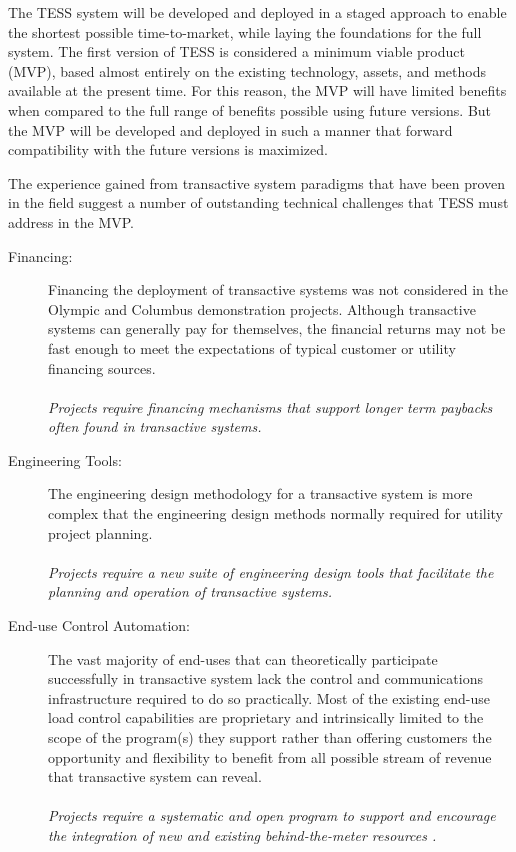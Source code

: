 The TESS system will be developed and deployed in a staged approach to enable the shortest possible time-to-market, while laying the foundations for the full system.  The first version of TESS is considered a minimum viable product (MVP), based almost entirely on the existing technology, assets, and methods available at the present time. For this reason, the MVP will have limited benefits when compared to the full range of benefits possible using future versions.  But the MVP will be developed and deployed in such a manner that forward compatibility with the future versions is maximized.

The experience gained from transactive system paradigms that have been proven in the field suggest a number of outstanding technical challenges that TESS must address in the MVP.  

\begin{description}

    \item[Financing:] Financing the deployment of transactive systems was not considered in the Olympic and Columbus demonstration projects. Although transactive systems can generally pay for themselves, the financial returns may not be fast enough to meet the expectations of typical customer or utility financing sources. 
    \\~\\
    \textit{Projects require financing mechanisms that support longer term paybacks often found in transactive systems.}

    \item[Engineering Tools:] The engineering design methodology for a transactive system is more complex that the engineering design methods normally required for utility project planning.  
    \\~\\
    \textit{Projects require a new suite of engineering design tools that facilitate the planning and operation of transactive systems.}

    \item[End-use Control Automation:] The vast majority of end-uses that can theoretically participate successfully in transactive system lack the control and communications infrastructure required to do so practically. Most of the existing end-use load control capabilities are proprietary and intrinsically limited to the scope of the program(s) they support rather than offering customers the opportunity and flexibility to benefit from all possible stream of revenue that transactive system can reveal.  
    \\~\\
    \textit{Projects require a systematic and open program to support and encourage the integration of new and existing behind-the-meter resources .}


\end{description}
